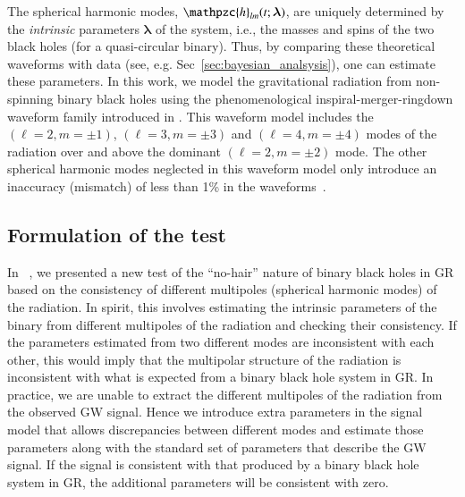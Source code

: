 \documentclass[prd,preprintnumbers,twocolumn,eqsecnum,floatfix,a4paper,nofootinbib,superscriptaddress]{revtex4}
\newcommand{\h}{\mathpzc{h}}
\newcommand{\blambda}{\bm{\lambda}}
\begin{document}
The spherical harmonic modes, ${\h}_{lm}(t; \blambda)$, are uniquely determined by the \emph{intrinsic} parameters $\blambda$ of the system, i.e., the masses and spins of the two black holes (for a quasi-circular binary). Thus, by comparing these theoretical waveforms with data (see, e.g. Sec~\ref{sec:bayesian_analsysis}), one can estimate these parameters. In this work, we model the gravitational radiation from non-spinning binary black holes using the phenomenological inspiral-merger-ringdown waveform family introduced in \cite{Mehta:2017jpq}. 
This waveform model includes the $(\ell = 2, m=\pm1)$, $(\ell = 3, m=\pm3)$ and $(\ell = 4, m = \pm4)$  modes of the radiation over and above the dominant $(\ell = 2, m = \pm2)$ mode. The other spherical harmonic modes neglected in this waveform model only introduce an inaccuracy (mismatch) of less than 1\% in the waveforms~\cite{Mehta:2017jpq}. 


\subsection{Formulation of the test}
\label{sec:formulation}

In ~\cite{Dhanpal:2018ufk}, we presented a new test of the ``no-hair'' nature of binary black holes in GR based on the consistency of different multipoles (spherical harmonic modes) of the radiation. In spirit, this involves estimating the intrinsic parameters of the binary from different multipoles of the radiation and checking their consistency. If the parameters estimated from two different modes are inconsistent with each other, this would imply that the multipolar structure of the radiation is inconsistent with what is expected from a binary black hole system in GR. In practice, we are unable to extract the different multipoles of the radiation from the observed GW signal. Hence we introduce extra parameters in the signal model that allows discrepancies between different modes and estimate those parameters along with the standard set of parameters that describe the GW signal. If the signal is consistent with that produced by a binary black hole system in GR, the additional parameters will be consistent with zero. 
\end{document}
